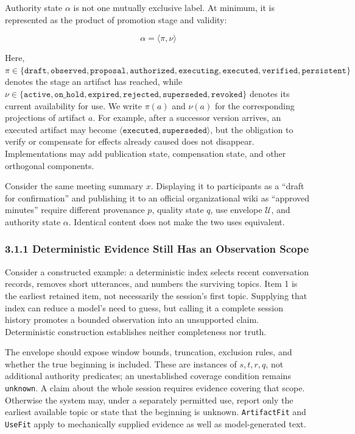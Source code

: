 Authority state \(\alpha\) is not one mutually exclusive label. At minimum, it is represented as the product of promotion stage and validity:

\[
\alpha=\langle\pi,\nu\rangle
\]

Here,
\(\pi\in\{\texttt{draft},\texttt{observed},\texttt{proposal},\texttt{authorized},\texttt{executing},\texttt{executed},\texttt{verified},\texttt{persistent}\}\)
denotes the stage an artifact has reached, while
\(\nu\in\{\texttt{active},\texttt{on\_hold},\texttt{expired},\texttt{rejected},\texttt{superseded},\texttt{revoked}\}\)
denotes its current availability for use. We write \(\pi(a)\) and \(\nu(a)\) for the corresponding projections of artifact \(a\). For example, after a successor version arrives, an executed artifact may become
\(\langle\texttt{executed},\texttt{superseded}\rangle\), but the obligation to verify or compensate for effects already caused does not disappear. Implementations may add publication state, compensation state, and other orthogonal components.

Consider the same meeting summary \(x\). Displaying it to participants as a ``draft for confirmation'' and publishing it to an official organizational wiki as ``approved minutes'' require different provenance \(p\), quality state \(q\), use envelope \(\mathcal U\), and authority state \(\alpha\). Identical content does not make the two uses equivalent.

\subsubsection{3.1.1 Deterministic Evidence Still Has an Observation Scope}\label{deterministic-evidence-still-has-an-observation-scope}

Consider a constructed example: a deterministic index selects recent conversation records, removes short utterances, and numbers the surviving topics. Item 1 is the earliest retained item, not necessarily the session's first topic. Supplying that index can reduce a model's need to guess, but calling it a complete session history promotes a bounded observation into an unsupported claim. Deterministic construction establishes neither completeness nor truth.

The envelope should expose window bounds, truncation, exclusion rules, and whether the true beginning is included. These are instances of \(s,t,r,q\), not additional authority predicates; an unestablished coverage condition remains \passthrough{\lstinline!unknown!}. A claim about the whole session requires evidence covering that scope. Otherwise the system may, under a separately permitted use, report only the earliest available topic or state that the beginning is unknown. \passthrough{\lstinline!ArtifactFit!} and \passthrough{\lstinline!UseFit!} apply to mechanically supplied evidence as well as model-generated text.

